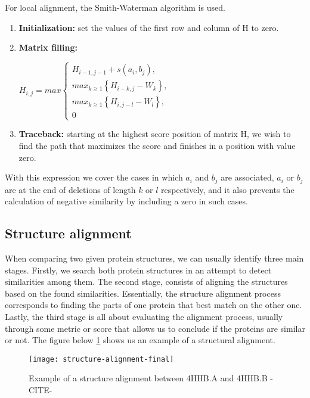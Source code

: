 For local alignment, the Smith-Waterman \cite{smith1981identification} algorithm is used.

\begin{enumerate}
	\item \textbf{Initialization:} set the values of the first row and column of H to zero.
	
	\item \textbf{Matrix filling:} 
	
\begin{center}
	$ H_{i,j} = max\begin{cases}H_{i-1,j-1} + s(a_{i},b_{j}), 
	\\ max_{k\geq1} \left\{ H_{i-k,j}- W_{k} \right\},
	\\ max_{k\geq1} \left\{ H_{i,j-l}- W_{l} \right\},
	\\ 0\end{cases} $
\end{center}

	\item \textbf{Traceback:} starting at the highest score position of matrix H, we wish to find the path that maximizes the score and finishes in a position with value zero. 
\end{enumerate}

With this expression we cover the cases in which $ a_{i} $ and $ b_{j} $ are associated, $ a_{i} $ or $ b_{j} $ are at the end of deletions of length $ k $ or $ l $ respectively, and it also prevents the calculation of negative similarity by including a zero in such cases.

\subsection{Structure alignment} 

When comparing two given protein structures, we can usually identify three main stages. Firstly, we search both protein structures in an attempt to detect similarities among them. The second stage, consists of aligning the structures based on the found similarities. Essentially, the structure alignment process corresponds to finding the parts of one protein that best match on the other one. Lastly, the third stage is all about evaluating the alignment process, usually through some metric or score that allows us to conclude if the proteins are similar or not. The figure below \ref{fig:structurealignment} shows us an example of a structural alignment.

\begin{figure}[htbp]
	\centering
	\texttt{[image: structure-alignment-final]}
	\caption{Example of a structure alignment between 4HHB.A and 4HHB.B -CITE-}
	\label{fig:structurealignment}
\end{figure}

